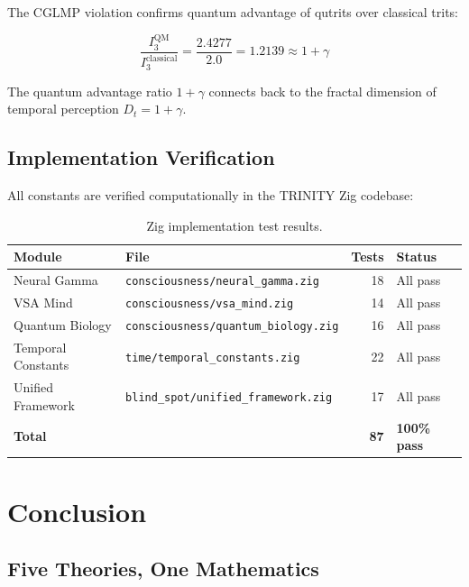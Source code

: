 \documentclass[12pt,a4paper]{article}
\begin{document}
The CGLMP violation confirms quantum advantage of qutrits over classical trits:

\begin{equation}
\frac{I_3^{\mathrm{QM}}}{I_3^{\mathrm{classical}}} = \frac{2.4277}{2.0}
= 1.2139 \approx 1 + \gamma
\end{equation}

\noindent
The quantum advantage ratio $1 + \gamma$ connects back to the fractal dimension
of temporal perception $D_t = 1 + \gamma$.

\subsection{Implementation Verification}

All constants are verified computationally in the TRINITY Zig codebase:

\begin{table}[h!]
\centering
\caption{Zig implementation test results.}
\label{tab:zig_tests}
\begin{tabular}{@{}llrl@{}}
\toprule
\textbf{Module} & \textbf{File} & \textbf{Tests} & \textbf{Status} \\
\midrule
Neural Gamma & \texttt{consciousness/neural\_gamma.zig} & 18 & All pass \\
VSA Mind & \texttt{consciousness/vsa\_mind.zig} & 14 & All pass \\
Quantum Biology & \texttt{consciousness/quantum\_biology.zig} & 16 & All pass \\
Temporal Constants & \texttt{time/temporal\_constants.zig} & 22 & All pass \\
Unified Framework & \texttt{blind\_spot/unified\_framework.zig} & 17 & All pass \\
\midrule
\textbf{Total} & & \textbf{87} & \textbf{100\% pass} \\
\bottomrule
\end{tabular}
\end{table}

\section{Conclusion}
\label{sec:conclusion}

\subsection{Five Theories, One Mathematics}
\end{document}
